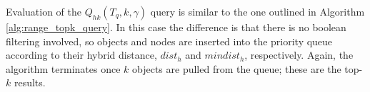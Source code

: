 Evaluation of the $Q_{hk}(T_q, k, \gamma)$ query is similar to the one outlined in Algorithm \ref{alg:range_topk_query}. In this case the difference is that there is no boolean filtering involved, so objects and nodes are inserted into the priority queue according to their hybrid distance, $dist_h$ and $mindist_h$, respectively. Again, the algorithm terminates once $k$ objects are pulled from the queue; these are the top-$k$ results.





%


